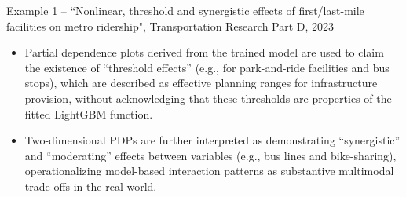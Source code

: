\documentclass[11pt]{article}
\newcounter{se}[section]
\begin{document}
\begin{mainbox}{Example 1 – ``Nonlinear, threshold and synergistic effects of first/last-mile facilities on metro ridership", Transportation Research Part D, 2023}
\begin{itemize}
\item Partial dependence plots derived from the trained model are used to claim the existence of “threshold effects” (e.g., for park-and-ride facilities and bus stops), which are described as effective planning ranges for infrastructure provision, without acknowledging that these thresholds are properties of the fitted LightGBM function.

\item Two-dimensional PDPs are further interpreted as demonstrating “synergistic” and “moderating” effects between variables (e.g., bus lines and bike-sharing), operationalizing model-based interaction patterns as substantive multimodal trade-offs in the real world.

\end{itemize}
\end{mainbox}
\vspace{0.5cm}
\end{document}
